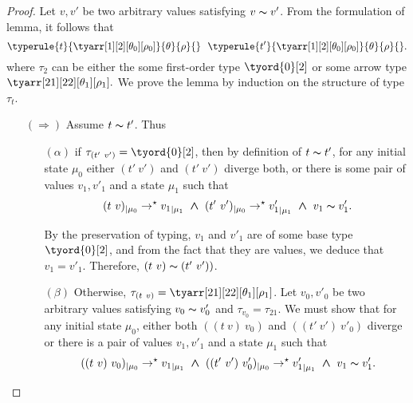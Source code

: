 \documentclass[a4paper,11pt,oneside]{article}
\theoremstyle{plain}
\newcommand{\tmapp}[2]{(#1 ~ #2)}
\newcommand{\ty}[1][]{\tau_{#1}}
\newcommand{\bwedge}{\boldsymbol{\wedge}}
\newcommand{\evalstar}[4]{~#1_{|\mu_#2} \rightarrow^{\star} #3_{|\mu_#4} ~}
\newcommand{\eqv}[1]{#1 \thicksim #1'}
\begin{document}
	\begin{proof}
		Let $v, v'$ be two arbitrary values satisfying $\eqv{v}$.
		From the formulation of lemma, it follows that
		$$	\typerule{t}{\tyarr[1][2][\theta_0][\rho_0]}{\theta}{\rho}{} ~~ 
				\typerule{t'}{\tyarr[1][2][\theta_0][\rho_0]}{\theta}{\rho}{}.$$
		where $\ty[2]$ can be either the some first-order type $\tyord{0}[2]$ or
		some arrow type $\tyarr[21][22][\theta_1][\rho_1].$ 
		We prove the lemma by induction on the structure of type $\ty[t]$.
	\begin{itemize}		
	
		\item[$(\Rightarrow)$] Assume $\eqv{t}$. Thus 		
		
		\begin{itemize}
		
		\item[$(\alpha)$] if $\ty[\tmapp{t'}{v'}] = \tyord{0}[2]$, then
		by definition of $\eqv{t}$, for any initial state $\mu_0$ either 
		$\tmapp{t'}{v'}$ and $\tmapp{t'}{v'}$ diverge both, 
		or there is some pair of values $v_1, v'_1$ and a state $\mu_1$ such that 
		$$\evalstar{\tmapp{t}{v}}{0}{{v_1}}{1} 
			\bwedge \evalstar{\tmapp{t'}{v'}}{0}{{v'_1}}{1} \bwedge~\eqv{v_1}.$$
		
		By the preservation of typing, $v_1$ and $v'_1$ are of some base 
		type $\tyord{0}[2]$, and from the fact that they are values, we deduce
		that $v_1 = v'_1$. Therefore,  $\tmapp{t}{v} \thicksim \tmapp{t'}{v'})$.
			
		\item[$(\beta)$] Otherwise, 
		$\ty[\tmapp{t}{v}] = \tyarr[21][22][\theta_1][\rho_1]$.
		Let $v_0, v'_0$ be two arbitrary values satisfying $\eqv{v_0}$ and 
		$\ty[v_0] = \ty[21]$. We must show that for any initial state $\mu_0$,
		either both 
		$\tmapp{\tmapp{t}{v}}{v_0}$ and $\tmapp{\tmapp{t'}{v'}}{v'_0}$ diverge
		or there is a pair of values $v_1, v'_1$ and a state $\mu_1$ such that 
		$$\evalstar{\tmapp{\tmapp{t}{v}}{v_0}}{0}{{v_1}}{1} \bwedge
		\evalstar{\tmapp{\tmapp{t'}{v'}}{v'_0}}{0}{{v'_1}}{1} \bwedge~\eqv{v_1}.$$
		

\end{itemize}
\end{itemize}
\end{proof}
\end{document}
